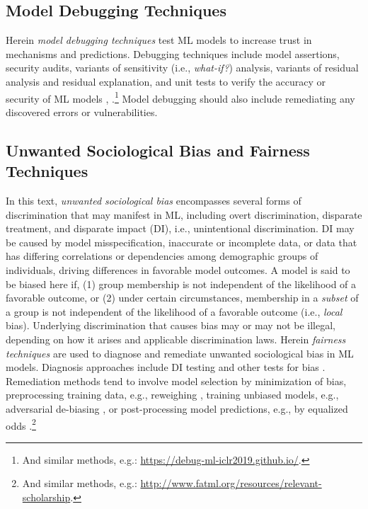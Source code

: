 \documentclass{article}
\begin{document}
\subsection{Model Debugging Techniques}

Herein \textit{model debugging techniques} test ML models to increase trust in mechanisms and predictions. Debugging techniques include model assertions, security audits, variants of sensitivity (i.e., \textit{what-if?}) analysis, variants of residual analysis and residual explanation, and unit tests to verify the accuracy or security of ML models \cite{modeltracker}, \cite{kangdebugging}.\footnote{\scriptsize{And similar methods, e.g.: \url{https://debug-ml-iclr2019.github.io/}.}} Model debugging should also include remediating any discovered errors or vulnerabilities.

\subsection{Unwanted Sociological Bias and Fairness Techniques}

In this text, \textit{unwanted sociological bias} encompasses several forms of discrimination that may manifest in ML, including overt discrimination, disparate treatment, and disparate impact (DI), i.e., unintentional discrimination. DI may be caused by model misspecification, inaccurate or incomplete data, or data that has differing correlations or dependencies among demographic groups of individuals, driving differences in favorable model outcomes. A model is said to be biased here if, (1) group membership is not independent of the likelihood of a favorable outcome, or (2) under certain circumstances, membership in a \textit{subset} of a group is not independent of the likelihood of a favorable outcome (i.e., \textit{local} bias). Underlying discrimination that causes bias may or may not be illegal, depending on how it arises and applicable discrimination laws. Herein \textit{fairness techniques} are used to diagnose and remediate unwanted sociological bias in ML models. Diagnosis approaches include DI testing and other tests for bias \cite{feldman2015certifying}. Remediation methods tend to involve model selection by minimization of bias, preprocessing training data, e.g., reweighing \cite{kamiran2012data}, training unbiased models, e.g., adversarial de-biasing \cite{zhang2018mitigating}, or post-processing model predictions, e.g., by equalized odds \cite{hardt2016equality}.\footnote{\scriptsize{And similar methods, e.g.: \url{http://www.fatml.org/resources/relevant-scholarship}.}} 
\end{document}
